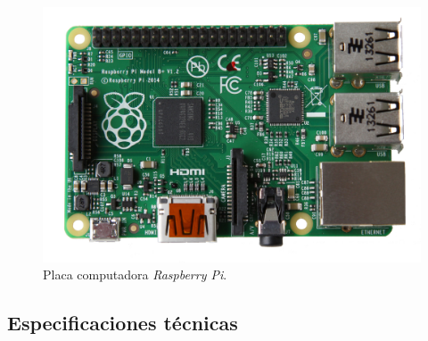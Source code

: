 \begin{figure}[H]
	\noindent \begin{centering}
		\includegraphics[width=\linewidth/2]{capitulo3/raspberry}
		\par\end{centering}
	\smallskip
	\caption{\label{fig:raspberry} Placa computadora \textit{Raspberry Pi}.}
\end{figure} 

\smallskip

\subsection{Especificaciones técnicas}

\smallskip

